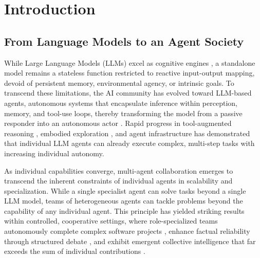 \section{Introduction}
\label{sec:intro}

\subsection{From Language Models to an Agent Society}
\label{sec:agent_society}

While Large Language Models (LLMs) excel as cognitive engines \cite{openai2023gpt4, claude, brown2020language}, a standalone model remains a stateless function restricted to reactive input-output mapping, devoid of persistent memory, environmental agency, or intrinsic goals. To transcend these limitations, the AI community has evolved toward LLM-based agents, autonomous systems that encapsulate inference within perception, memory, and tool-use loops, thereby transforming the model from a passive responder into an autonomous actor \cite{xi2023rise, li2024survey, wang2024survey_agents}. Rapid progress in tool-augmented reasoning \cite{yao2023react, schick2024toolformer, qin2024toolllm}, embodied exploration \cite{wang2023voyager}, and agent infrastructure \cite{mei2024aios, liu2024agentbench} has demonstrated that individual LLM agents can already execute complex, multi-step tasks with increasing individual autonomy. 

As individual capabilities converge, multi-agent collaboration emerges to transcend the inherent constraints of individual agents in scalability and specialization. While a single specialist agent can solve tasks beyond a single LLM model, teams of heterogeneous agents can tackle problems beyond the capability of any individual agent. This principle has yielded striking results within controlled, cooperative settings, where role-specialized teams autonomously complete complex software projects \cite{hong2023metagpt, qian2023communicative, wu2023autogen, li2023camel}, enhance factual reliability through structured debate \cite{du2024debate, chan2024chateval, zhuge2024gptswarm, zhang2024proagent}, and exhibit emergent collective intelligence that far exceeds the sum of individual contributions \cite{chen2023agentverse}.

